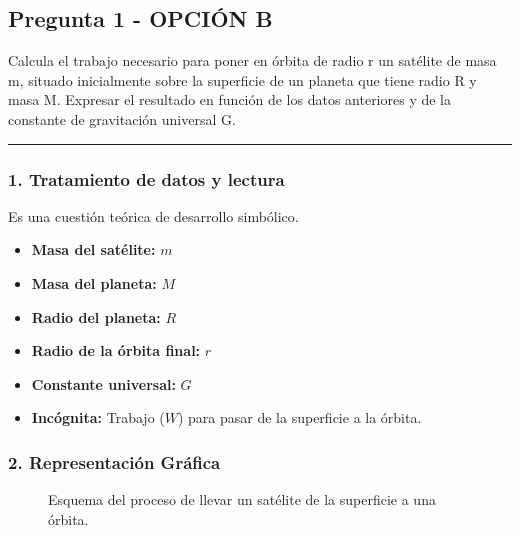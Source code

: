 \newpage

\subsection{Pregunta 1 - OPCIÓN B}
\label{subsec:1B_2007_sep_ext}

\begin{cajaenunciado}
Calcula el trabajo necesario para poner en órbita de radio r un satélite de masa m, situado inicialmente sobre la superficie de un planeta que tiene radio R y masa M. Expresar el resultado en función de los datos anteriores y de la constante de gravitación universal G.
\end{cajaenunciado}
\hrule

\subsubsection*{1. Tratamiento de datos y lectura}
Es una cuestión teórica de desarrollo simbólico.
\begin{itemize}
    \item \textbf{Masa del satélite:} $m$
    \item \textbf{Masa del planeta:} $M$
    \item \textbf{Radio del planeta:} $R$
    \item \textbf{Radio de la órbita final:} $r$
    \item \textbf{Constante universal:} $G$
    \item \textbf{Incógnita:} Trabajo ($W$) para pasar de la superficie a la órbita.
\end{itemize}

\subsubsection*{2. Representación Gráfica}
\begin{figure}[H]
    \centering
    \caption{Esquema del proceso de llevar un satélite de la superficie a una órbita.}
\end{figure}

